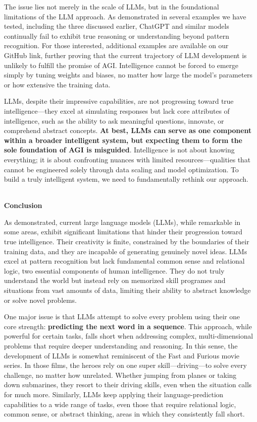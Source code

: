 \documentclass[11pt]{scrartcl}
\begin{document}
The issue lies not merely in the scale of LLMs, but in the foundational limitations of the LLM approach. As demonstrated in several examples we have tested, including the three discussed earlier, ChatGPT and similar models continually fail to exhibit true reasoning or understanding beyond pattern recognition. For those interested, additional examples are available on our GitHub link, further proving that the current trajectory of LLM development is unlikely to fulfill the promise of AGI. Intelligence cannot be forced to emerge simply by tuning weights and biases, no matter how large the model's parameters or how extensive the training data.

LLMs, despite their impressive capabilities, are not progressing toward true intelligence—they excel at simulating responses but lack core attributes of intelligence, such as the ability to ask meaningful questions, innovate, or comprehend abstract concepts. \textbf{At best, LLMs can serve as one component within a broader intelligent system, but expecting them to form the sole foundation of AGI is misguided}. Intelligence is not about knowing everything; it is about confronting nuances with limited resources—qualities that cannot be engineered solely through data scaling and model optimization. To build a truly intelligent system, we need to fundamentally rethink our approach. \\ \\

\vspace{1cm}

\begin{huge}
\textbf{Conclusion}
\end{huge}
As demonstrated, current large language models (LLMs), while remarkable in some areas, exhibit significant limitations that hinder their progression toward true intelligence. Their creativity is finite, constrained by the boundaries of their training data, and they are incapable of generating genuinely novel ideas. LLMs excel at pattern recognition but lack fundamental common sense and relational logic, two essential components of human intelligence. They do not truly understand the world but instead rely on memorized skill programes and situations from vast amounts of data, limiting their ability to abstract knowledge or solve novel problems.

One major issue is that LLMs attempt to solve every problem using their one core strength: \textbf{predicting the next word in a sequence}. This approach, while powerful for certain tasks, falls short when addressing complex, multi-dimensional problems that require deeper understanding and reasoning. In this sense, the development of LLMs is somewhat reminiscent of the Fast and Furious movie series. In those films, the heroes rely on one super skill—driving—to solve every challenge, no matter how unrelated. Whether jumping from planes or taking down submarines, they resort to their driving skills, even when the situation calls for much more. Similarly, LLMs keep applying their language-prediction capabilities to a wide range of tasks, even those that require relational logic, common sense, or abstract thinking, areas in which they consistently fall short.
\end{document}
